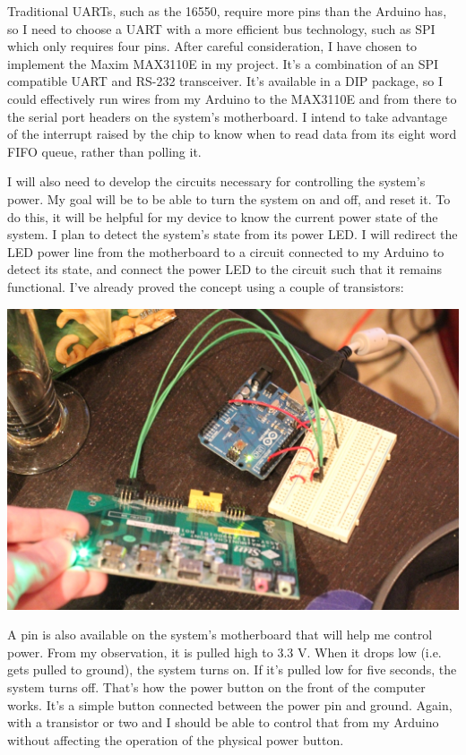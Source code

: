 \documentclass{amsart}
\begin{document}
Traditional UARTs, such as the 16550, require more pins than the Arduino has, so I need to choose a UART with a more efficient bus technology, such as SPI which only requires four pins.  After careful consideration, I have chosen to implement the Maxim MAX3110E in my project.  It's a combination of an SPI compatible UART and RS-232 transceiver.  It's available in a DIP package, so I could effectively run wires from my Arduino to the MAX3110E and from there to the serial port headers on the system's motherboard.  I intend to take advantage of the interrupt raised by the chip to know when to read data from its eight word FIFO queue, rather than polling it.

I will also need to develop the circuits necessary for controlling the system's power.  My goal will be to be able to turn the system on and off, and reset it.  To do this, it will be helpful for my device to know the current power state of the system.  I plan to detect the system's state from its power LED.  I will redirect the LED power line from the motherboard to a circuit connected to my Arduino to detect its state, and connect the power LED to the circuit such that it remains functional.  I've already proved the concept using a couple of transistors:

\begin{center}
\includegraphics[width=.9\textwidth]{pled.jpg}
\end{center}

A pin is also available on the system's motherboard that will help me control power.  From my observation, it is pulled high to 3.3 V.  When it drops low (i.e. gets pulled to ground), the system turns on.  If it's pulled low for five seconds, the system turns off.  That's how the power button on the front of the computer works.  It's a simple button connected between the power pin and ground.  Again, with a transistor or two and I should be able to control that from my Arduino without affecting the operation of the physical power button.
\end{document}
